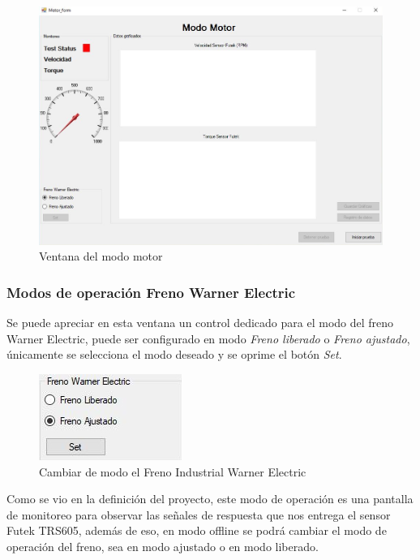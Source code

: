\documentclass[12pt,titlepage]{article}
\begin{document}
\begin{figure}[htbp]
\hspace*{2.8cm} 
\includegraphics[scale=0.50]{Motor_form}
\caption{Ventana del modo motor}
\end{figure}
\subsubsection{Modos de operación Freno Warner Electric}
Se puede apreciar en esta ventana un control dedicado para el modo del freno Warner Electric, puede ser configurado en modo \textit{Freno liberado} o \textit{Freno ajustado}, únicamente se selecciona el modo deseado y se oprime el botón \textit{Set}. \\ 

\begin{figure}[htbp]
\hspace*{6.8cm} 
\includegraphics[scale=0.77]{Freno_seett}
\caption{Cambiar de modo el Freno Industrial Warner Electric}
\end{figure}

Como se vio en la definición del proyecto, este modo de operación es una pantalla de monitoreo para observar las señales de respuesta que nos entrega el sensor Futek TRS605, además de eso, en modo offline se podrá cambiar el modo de operación del freno, sea en modo ajustado o en modo liberado. 
\end{document}

